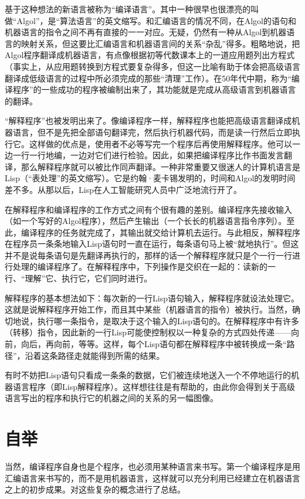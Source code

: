 基于这种想法的新语言被称为“编译语言”。其中一种很早也很漂亮的叫做“Algol”，是“算法语言”的英文缩写。和汇编语言的情况不同，在Algol的语句和机器语言的指令之间不再有直接的一一对应。无疑，仍然有一种从Algol到机器语言的映射关系，但这要比汇编语言和机器语言间的关系“杂乱”得多。粗略地说，把Algol程序翻译成机器语言，有点像根据初等代数课本上的一道应用题列出方程式（事实上，从应用题转换到方程式要复杂得多，但这一比喻有助于体会把高级语言翻译成低级语言的过程中所必须完成的那些“清理”工作）。在50年代中期，称为“编译程序”的一些成功的程序被编制出来了，其功能就是完成从高级语言到机器语言的翻译。

“解释程序”也被发明出来了。像编译程序一样，解释程序也能把高级语言翻译成机器语言，但不是先把全部语句翻译完，然后执行机器代码，而是读一行然后立即执行它。这样做的优点是，使用者不必等写完一个程序后再使用解释程序。他可以一边一行一行地编，一边对它们进行检验。因此，如果把编译程序比作书面发言翻译，那么解释程序就可以被比作同声翻译。一种非常重要又很迷人的计算机语言是Lisp（“表处理”的英文缩写）。它是约翰·麦卡锡发明的，时间和Algol的发明时间差不多。从那以后，Lisp在人工智能研究人员中广泛地流行开了。

在解释程序和编译程序的工作方式之间有个很有趣的差别。编译程序先接收输入（如一个写好的Algol程序），然后产生输出（一个长长的机器语言指令序列）。至此，编译程序的任务就完成了，其输出就交给计算机去运行。与此相反，解释程序在程序员一条条地输入Lisp语句时一直在运行，每条语句马上被“就地执行”。但这并不是说每条语句是先翻译再执行的，那样的话一个解释程序就只是个一行一行进行处理的编译程序了。在解释程序中，下列操作是交织在一起的：读新的一行、“理解”它、执行它，它们同时进行。

解释程序的基本想法如下：每次新的一行Lisp语句输入，解释程序就设法处理它。这就是说解释程序开始工作，而且其中某些（机器语言的指令）被执行。当然，确切地说，执行哪一条指令，是取决于这个输入的Lisp语句的。在解释程序中有许多（转移）指令，因此新的一行Lisp可能使控制权以一种复杂的方式四处传递——向前，向后，再向前，等等。这样，每个Lisp语句都在解释程序中被转换成一条“路径”，沿着这条路径走就能得到所需的结果。

有时不妨把Lisp语句只看成一条条的数据，它们被连续地送入一个不停地运行的机器语言程序（即Lisp解释程序）。这样想往往是有帮助的，由此你会得到关于高级语言写出的程序和执行它的机器之间的关系的另一幅图像。

\section{自举}

当然，编译程序自身也是个程序，也必须用某种语言来书写。第一个编译程序是用汇编语言来书写的，而不是用机器语言，这样就可以充分利用已经建立在机器语言之上的初步成果。对这些复杂的概念进行了总结。

